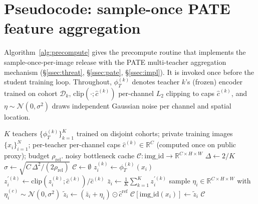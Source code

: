 
\appendix

\section{Pseudocode: sample-once PATE feature aggregation}
\label{app:pseudocode}

Algorithm~\ref{alg:precompute} gives the precompute routine that
implements the sample-once-per-image release with the PATE
multi-teacher aggregation mechanism (\S\ref{ssec:threat},
\S\ref{ssec:pate}, \S\ref{ssec:impl}). It is invoked once before the
student training loop. Throughout, $\phi_T^{(k)}$ denotes teacher $k$'s
(frozen) encoder trained on cohort $\mathcal{D}_k$,
$\mathrm{clip}(\cdot;\widehat{c}^{(k)})$ per-channel $L_2$ clipping to
caps $\widehat{c}^{(k)}$, and $\eta\sim\mathcal{N}(0,\sigma^2)$ draws
independent Gaussian noise per channel and spatial location.

\begin{algorithm}[t]
\caption{Sample-once precompute of PATE-aggregated noisy bottlenecks.}
\label{alg:precompute}
\begin{algorithmic}[1]
\Require $K$ teachers $\{\phi_T^{(k)}\}_{k=1}^K$ trained on disjoint
         cohorts; private training images $\{x_i\}_{i=1}^{N}$;
         per-teacher per-channel caps $\widehat{c}^{(k)} \in \mathbb{R}^{C}$
         (computed once on public proxy); budget $\rho_{\mathrm{rel}}$.
\Ensure  noisy bottleneck cache
         $\mathcal{C}:\mathrm{img\_id}\!\to\!\mathbb{R}^{C\times H\times W}$
\State $\Delta \gets 2/K$                                            
\State $\sigma \gets \sqrt{C\,\Delta^{2} / (2\rho_{\mathrm{rel}})}$    
\State $\mathcal{C} \gets \emptyset$
    \State $z_i^{(k)} \gets \phi_T^{(k)}(x_i)$                         
    \State $z_i^{\prime (k)} \gets \mathrm{clip}(z_i^{(k)}; \widehat{c}^{(k)}) / \widehat{c}^{(k)}$
  \EndFor
  \State $\bar z_i \gets \tfrac{1}{K}\sum_{k=1}^{K} z_i^{\prime (k)}$  
  \State sample $\eta_i \in \mathbb{R}^{C\times H\times W}$ with
         $\eta_i^{(c)} \!\sim\! \mathcal{N}(0,\sigma^{2})$
  \State $\widetilde{z}_i \gets (\bar z_i + \eta_i)\odot \widehat{c}^{\mathrm{ref}}$
  \State $\mathcal{C}[\mathrm{img\_id}(x_i)] \gets \widetilde{z}_i$
\EndFor
\State \Return $\mathcal{C}$
\end{algorithmic}
\end{algorithm}

